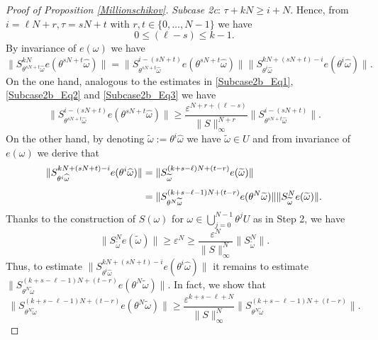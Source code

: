 \documentclass[pdflatex,sn-mathphys-num]{sn-jnl}%
\theoremstyle{thmstyleone}%
\theoremstyle{thmstyletwo}%
\theoremstyle{thmstylethree}%
\newcommand{\eps}{\varepsilon}
\numberwithin{equation}{section}
\begin{document}
\begin{proof}[Proof of Proposition \ref{Millionschikov}]
\emph{Subcase 2c}: $ \tau+kN\geq i+N$.  Hence, from $i=\ell N+r, \tau=sN+t$ with $r,t\in \{0,\dots,N-1\}$ we have 
\begin{equation}\label{estimateindex_casec}
0\leq (\ell-s)\leq k-1.    
\end{equation}
By invariance of $e(\omega)$ we have 
\begin{equation}\label{Twoparts}
\|S^{kN}_{\theta^{sN+t}\widehat\omega}e(\theta^{sN+t}\widehat\omega)\|=  \|S^{i-(sN+t)}_{\theta^{sN+t}\widehat\omega}e(\theta^{sN+t}\widehat\omega)\|  \|S^{kN+(sN+t)-i}_{\theta^{i}\widehat\omega}e(\theta^{i}\widehat\omega)\|.
\end{equation}
On the one hand, analogous to the estimates in \eqref{Subcase2b_Eq1}, \eqref{Subcase2b_Eq2} and \eqref{Subcase2b_Eq3} we have 
\begin{equation}\label{Estimate_Part1}
  \|S^{i-(sN+t)}_{\theta^{sN+t}\widehat\omega}e(\theta^{sN+t}\widehat\omega)\| 
  \geq \frac{\eps^{N+r+(\ell-s)}}{\|S\|_{\infty}^{N+r}}\|S^{i-(sN+t)}_{\theta^{sN+t}\widehat\omega}\|.
\end{equation}
On the other hand,  by denoting $\widetilde\omega:=\theta^i\widehat\omega$ we have $\widetilde \omega\in U$ and from  invariance of $e(\omega)$ we derive that 
\begin{align}
\|S^{kN+(sN+t)-i}_{\theta^{i}\widehat\omega}e(\theta^{i}\widehat\omega)\|
&=\|S_{\widetilde\omega}^{(k+s-\ell)N+(t-r)}e(\widetilde\omega)\|\notag\\[1ex]
&=
\|S_{\theta^N\widetilde\omega}^{(k+s-\ell-1)N+(t-r)}e(\theta^N\widetilde\omega)\|
\|S_{\widetilde\omega}^{N}e(\widetilde\omega)\|.\label{New_Estimate1}
\end{align}
Thanks to the construction of $S(\omega)$ for $\omega\in\bigcup_{j=0}^{N-1}\theta^j U$ as in Step 2, we have \begin{equation}\label{New_Estimate2}
 \|S_{\widetilde\omega}^{N}e(\widetilde\omega)\|
 \geq 
 \eps^N\geq \frac{\eps^N}{\|S\|_{\infty}^N}\|S^N_{\widetilde\omega}\|.
\end{equation}
Thus, to estimate $\|S^{kN+(sN+t)-i}_{\theta^{i}\widehat\omega}e(\theta^{i}\widehat\omega)\|$ it remains to estimate $\|S_{\theta^N\widetilde\omega}^{(k+s-\ell-1)N+(t-r)}e(\theta^N\widetilde\omega)\|$. In fact, we show that 
\begin{equation}\label{Smallaim}
  \|S_{\theta^N\widetilde\omega}^{(k+s-\ell-1)N+(t-r)}e(\theta^N\widetilde\omega)\| 
  \geq \frac{\eps^{k+s-\ell+N}}{\|S\|_{\infty}^N}       \|S_{\theta^N\widetilde\omega}^{(k+s-\ell-1)N+(t-r)}\|.
\end{equation}

\end{proof}
\end{document}
